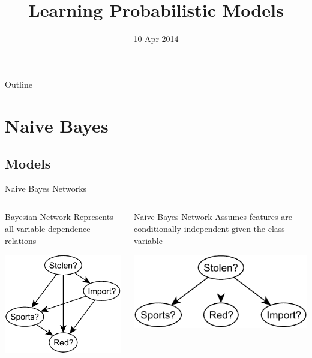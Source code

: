 \documentclass[14pt]{beamer}
\title{Learning Probabilistic Models}
\date[]{10 Apr 2014}
\begin{document}
\begin{frame}
\titlepage
\end{frame}

\begin{frame}{Outline}
\tableofcontents
\end{frame}

\section{Naive Bayes}

\subsection{Models}

\begin{frame}{Naive Bayes Networks}
\begin{columns}[t]
\begin{column}{2in}
\begin{block}{Bayesian Network}
Represents all variable dependence relations
\end{block}
\begin{center}
\includegraphics[scale=.75]{stolen-bayes-net}
\end{center}
\end{column}
\pause
\begin{column}{2in}
\begin{block}{Naive Bayes Network}
Assumes features are conditionally independent given the class variable
\end{block}
\begin{center}
\includegraphics[scale=.75]{stolen-naive-bayes}
\end{center}
\end{column}
\end{columns}
\end{frame}
\end{document}
